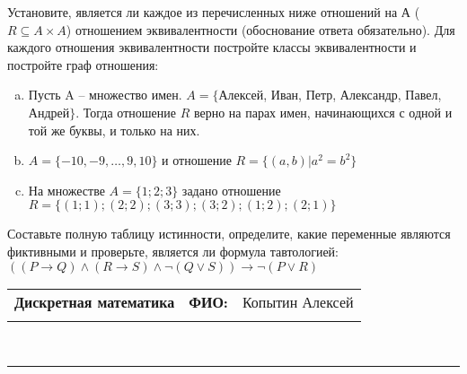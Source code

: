 \documentclass[10pt]{exam}
\newcommand{\class}{Дискретная математика}
\newcommand{\examdate}{}
\begin{document}
\begin{questions}
\question
Установите, является ли каждое из перечисленных ниже отношений на А ($R \subseteq A \times A$) отношением эквивалентности (обоснование ответа обязательно). Для каждого отношения эквивалентности постройте классы 
эквивалентности и постройте граф отношения:
\begin{enumerate} [a)]\setcounter{enumi}{0}
\item Пусть A – множество имен. $A = \{ $Алексей, Иван, Петр, Александр, Павел, Андрей$ \}$. Тогда отношение $R$ верно на парах имен, начинающихся с одной и той же буквы, и только на них.
\item $A = \{-10, -9, … , 9, 10\}$ и отношение $ R = \{(a,b)|a^{2} = b^{2}\}$
\item На множестве $A = \{1; 2; 3\}$ задано отношение $R = \{(1; 1); (2; 2); (3; 3); (3; 2); (1; 2); (2; 1)\}$
\end{enumerate}\question Составьте полную таблицу истинности, определите, какие переменные являются фиктивными и проверьте, является ли формула тавтологией:
$((P \rightarrow Q) \land (R \rightarrow S) \land \neg (Q \lor S)) \rightarrow \neg (P \lor R)$

\end{questions}
\newpage
\begin{flushright}
\begin{tabular}{p{2.8in} r l}
\textbf{\class} & \textbf{ФИО:} &Копытин Алексей
\\

\textbf{\examdate} &&\\
\end{tabular}\\
\end{flushright}
\rule[1ex]{\textwidth}{.1pt}
\end{document}
